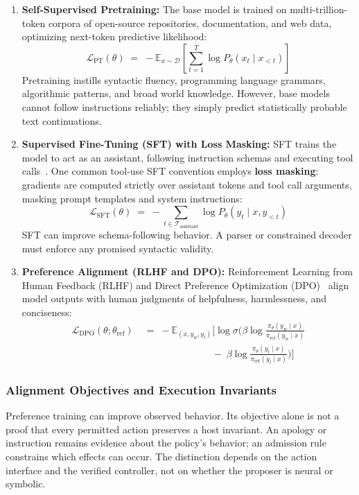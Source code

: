 \documentclass[11pt,a4paper]{article}
\begin{document}
\begin{enumerate}[leftmargin=1.8em,itemsep=3pt]
  \item \textbf{Self-Supervised Pretraining:} The base model is trained on multi-trillion-token corpora of open-source repositories, documentation, and web data, optimizing next-token predictive likelihood:
  \begin{equation}
  \mathcal{L}_{\mathrm{PT}}(\theta) \;=\; -\mathbb{E}_{x \sim \mathcal{D}}\left[ \sum_{t=1}^T \log P_\theta(x_t \mid x_{<t}) \right]
  \end{equation}
  Pretraining instills syntactic fluency, programming language grammars, algorithmic patterns, and broad world knowledge. However, base models cannot follow instructions reliably; they simply predict statistically probable text continuations.

  \item \textbf{Supervised Fine-Tuning (SFT) with Loss Masking:} SFT trains the model to act as an assistant, following instruction schemas and executing tool calls~. One common tool-use SFT convention employs \textbf{loss masking}: gradients are computed strictly over assistant tokens and tool call arguments, masking prompt templates and system instructions:
  \begin{equation}
  \mathcal{L}_{\mathrm{SFT}}(\theta) \;=\; -\sum_{t \in \mathcal{T}_{\mathrm{assistant}}} \log P_\theta(y_t \mid x, y_{<t})
  \end{equation}
  SFT can improve schema-following behavior. A parser or constrained decoder must enforce any promised syntactic validity.

  \item \textbf{Preference Alignment (RLHF and DPO):} Reinforcement Learning from Human Feedback (RLHF) and Direct Preference Optimization (DPO)~ align model outputs with human judgments of helpfulness, harmlessness, and conciseness:
  \begin{align}
  \mathcal{L}_{\mathrm{DPO}}(\theta; \theta_{\mathrm{ref}}) \;&=\; -\mathbb{E}_{(x, y_w, y_l)}\Big[ \log \sigma \Big( \beta \log \frac{\pi_\theta(y_w \mid x)}{\pi_{\mathrm{ref}}(y_w \mid x)} \nonumber \\
  &\qquad\qquad\qquad\quad -\; \beta \log \frac{\pi_\theta(y_l \mid x)}{\pi_{\mathrm{ref}}(y_l \mid x)} \Big) \Big]
  \end{align}
\end{enumerate}

\subsubsection{Alignment Objectives and Execution Invariants}
Preference training can improve observed behavior. Its objective alone is not a proof that every permitted action preserves a host invariant. An apology or instruction remains evidence about the policy's behavior; an admission rule constrains which effects can occur. The distinction depends on the action interface and the verified controller, not on whether the proposer is neural or symbolic.
\end{document}
